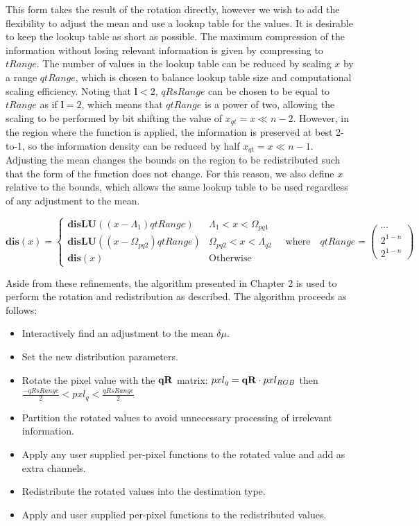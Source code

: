   This form takes the result of the rotation directly, however we wish to add the flexibility to adjust the mean and use a lookup table for the values. It is desirable to keep the lookup table as short as possible. The maximum compression of the information without losing relevant information is given by compressing to $tRange$. The number of values in the lookup table can be reduced by scaling $x$ by a range $qtRange$, which is chosen to balance lookup table size and computational scaling efficiency.  Noting that $\mathbf{l} <2$, $qRsRange$ can be chosen to be equal to $tRange$ as if $\mathbf{l} =2$, which means that $qtRange$ is a power of two, allowing the scaling to be performed by bit shifting the value of $x_{qt} = x \ll n-2$. However, in the region where the function is applied, the information is preserved at best 2-to-1, so the information density can be reduced by half $x_{qt} = x \ll n-1$. Adjusting the mean changes the bounds on the region to be redistributed such that the form of the function does not change. For this reason, we also define $x$ relative to the bounds, which allows the same lookup table to be used regardless of any adjustment to the mean.
  
    \begin{equation}
  \textbf{dis}(x) =  \begin{cases}
    \textbf{disLU}((x-\Lambda_{1}) qtRange)  & \Lambda_{1} < x < \Omega_{pq1} \\
  \textbf{disLU}((x-\Omega_{pq2}) qtRange)  & \Omega_{pq2} < x < \Lambda_{q2} \\
  \textbf{dis}(x)  & \text{Otherwise}
    \end{cases} \quad \text{where} \quad 
    qtRange = \left(\begin{smallmatrix}
    \cdots \\ 2^{1-n}\\2^{1-n}
    \end{smallmatrix}\right)
    \end{equation}
  
  Aside from these refinements, the algorithm presented in Chapter 2 is used to perform the rotation and redistribution as described. The algorithm proceeds as follows:
  
  \begin{itemize}
  \item Interactively find an adjustment to the mean  $\delta\mu$.
  \item Set the new distribution parameters.
  \item Rotate the pixel value with the $\qR$ matrix: $ pxl_{q} = \qR \cdot pxl_{RGB}$ then $ \frac{- qRsRange}{2} < pxl_{q} < \frac{ qRsRange}{2}$
  \item Partition the rotated values to avoid unnecessary processing of irrelevant information.
  \item Apply any user supplied per-pixel functions to the rotated value and add as extra channels.
  \item Redistribute the rotated values into the destination type.
  \item Apply and user supplied per-pixel functions to the redistributed values.
  \end{itemize}

